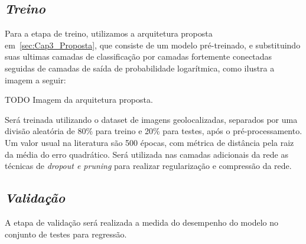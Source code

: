 \subsection{\textit{Treino}}\label{sec:Cap3_Treino}
Para a etapa de treino, utilizamos a arquitetura proposta em~\ref{sec:Cap3_Proposta}, que consiste de um modelo pré-treinado, e substituindo suas ultimas camadas de classificação por camadas fortemente conectadas seguidas de camadas de saída de probabilidade logarítmica, como ilustra a imagem a seguir:


TODO Imagem da arquitetura proposta.

Será treinada utilizando o dataset de imagens geolocalizadas, separados por uma divisão aleatória de 80\% para treino e 20\% para testes, após o pré-processamento. Um valor usual na literatura são 500 épocas, com métrica de distância pela raiz da média do erro quadrático. Será utilizada nas camadas adicionais da rede as técnicas de \textit{dropout e pruning} para realizar regularização e compressão da rede.




\subsection{\textit{Validação}}\label{sec:Cap3_Validacao}

A etapa de validação será realizada a medida do desempenho do modelo no conjunto de testes para regressão.







